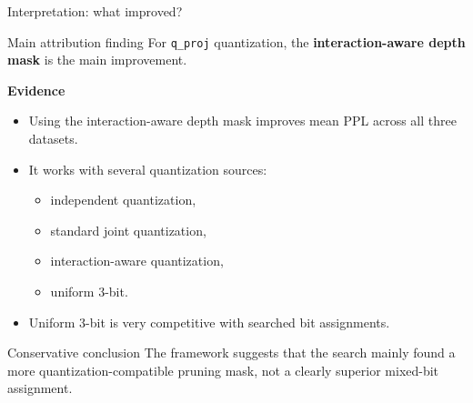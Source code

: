 \documentclass[aspectratio=169]{beamer}
\begin{document}
\begin{frame}{Interpretation: what improved?}
\begin{block}{Main attribution finding}
For \texttt{q\_proj} quantization, the \textbf{interaction-aware depth mask} is the main improvement.
\end{block}

\vspace{0.2cm}
\textbf{Evidence}
\begin{itemize}
    \item Using the interaction-aware depth mask improves mean PPL across all three datasets.
    \item It works with several quantization sources:
    \begin{itemize}
        \item independent quantization,
        \item standard joint quantization,
        \item interaction-aware quantization,
        \item uniform 3-bit.
    \end{itemize}
    \item Uniform 3-bit is very competitive with searched bit assignments.
\end{itemize}

\vspace{0.15cm}
\begin{block}{Conservative conclusion}
The framework suggests that the search mainly found a more quantization-compatible pruning mask, not a clearly superior mixed-bit assignment.
\end{block}
\end{frame}

\end{document}
